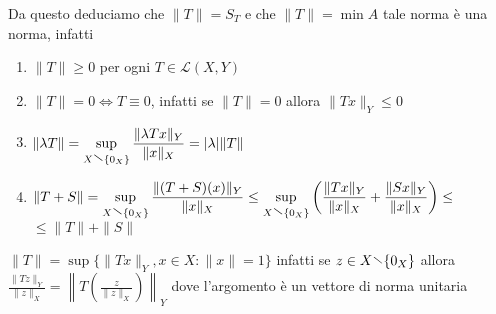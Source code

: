 Da questo deduciamo che \(\|T\| = S_T\) e che \(\|T\| = \min A\) 
tale norma è una norma, infatti
\begin{enumerate}[label = \arabic*.]
    \item \(\|T\| \ge 0\) per ogni \(T \in \mathcal{L}{(X, Y)}\) 
    \item \(\|T\| = 0 \iff T \equiv 0\), infatti se \(\|T\| =  0\) allora
        \(\|Tx\|_Y \le 0\) 
    \item \(\displaystyle \|\lambda T\| = \sup_{X \sminus \{0_X\}}  \frac{\|\lambda T x\|_Y}{\|x\|_X}
        = |\lambda|\|T\| \) 
    \item \(\displaystyle\|T+S\| = \sup_{X \sminus \{0_X\} }
        \frac{\|{(T+S)}{(x)}\|_Y}{\|x\|_X} \le \sup_{X \sminus \{0_X\} } {\left(
        \frac{\|Tx\|_Y}{\|x\|_X} + \frac{\|Sx\|_Y}{\|x\|_X}\right)}\le  \) \\\(\le
        \|T\|+\|S\| \) 
\end{enumerate}
\begin{remark}
    \(\|T\| = \sup \{\|Tx\|_Y, x \in X: \|x\|=1\} \) infatti se \(z \in X
    \sminus \{0_X\} \) allora \(\displaystyle \frac{\|Tz\|_Y}{\|z\|_X} = \left\|
    T {\left( \frac{z}{\|z\|_X} \right)} \right\|_Y\) dove l'argomento è un
    vettore di norma unitaria
\end{remark}


